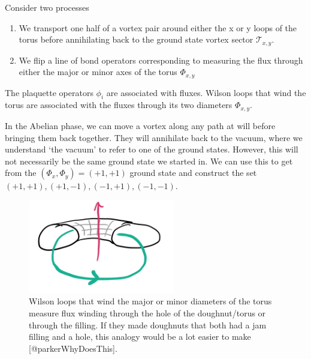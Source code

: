 Consider two processes

\begin{enumerate}
\def\labelenumi{\arabic{enumi})}
\item
  We transport one half of a vortex pair around either the x or y loops of the torus before annihilating back to the ground state vortex sector \(\mathcal{T}_{x,y}\).
\item
  We flip a line of bond operators corresponding to measuring the flux through either the major or minor axes of the torus \(\mathcal{\Phi}_{x,y}\)
\end{enumerate}

The plaquette operators \(\phi_i\) are associated with fluxes. Wilson loops that wind the torus are associated with the fluxes through its two diameters \(\mathcal{\Phi}_{x,y}\).

In the Abelian phase, we can move a vortex along any path at will before bringing them back together. They will annihilate back to the vacuum, where we understand `the vacuum' to refer to one of the ground states. However, this will not necessarily be the same ground state we started in. We can use this to get from the \((\Phi_x, \Phi_y) = (+1, +1)\) ground state and construct the set \((+1, +1), (+1, -1), (-1, +1), (-1, -1)\).

\begin{figure}
\hypertarget{fig:topological_fluxes}{%
\centering
\includegraphics[width=0.57\textwidth,height=\textheight]{figure_code/amk_chapter/topological_fluxes.png}
\caption[Topological Fluxes]{Wilson loops that wind the major or minor diameters of the
torus measure flux winding through the hole of the doughnut/torus or
through the filling. If they made doughnuts that both had a jam filling
and a hole, this analogy would be a lot easier to make
{[}@parkerWhyDoesThis{]}.}\label{fig:topological_fluxes}
}
\end{figure}

